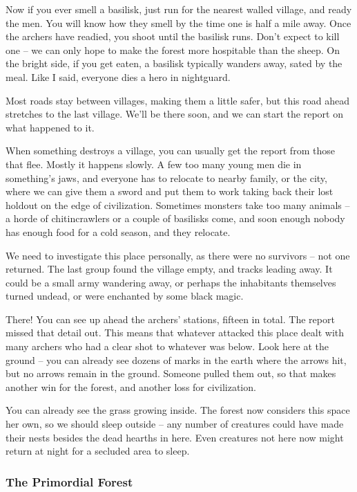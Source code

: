 \begin{multicols}{2}
\begin{exampletext}
	Now if you ever smell a basilisk, just run for the nearest walled village, and ready the men.
	You will know how they smell by the time one is half a mile away.
	Once the archers have readied, you shoot until the basilisk runs.
	Don't expect to kill one -- we can only hope to make the forest more hospitable than the sheep.
	On the bright side, if you get eaten, a basilisk typically wanders away, sated by the meal.
	Like I said, everyone dies a hero in \gls{nightguard}.

	Most roads stay between villages, making them a little safer, but this road ahead stretches to the last village.
	We'll be there soon, and we can start the report on what happened to it.

	When something destroys a village, you can usually get the report from those that flee.
	Mostly it happens slowly.
	A few too many young men die in something's jaws, and everyone has to relocate to nearby family, or the city, where we can give them a sword and put them to work taking back their lost holdout on the edge of civilization.
	Sometimes monsters take too many animals -- a horde of chitincrawlers or a couple of basilisks come, and soon enough nobody has enough food for a cold season, and they relocate.

	We need to investigate this place personally, as there were no survivors -- not one returned.
	The last group found the village empty, and tracks leading away.
	It could be a small army wandering away, or perhaps the inhabitants themselves turned undead, or were enchanted by some black magic.

	There! You can see up ahead the archers' stations, fifteen in total.
	The report missed that detail out.
	This means that whatever attacked this place dealt with many archers who had a clear shot to whatever was below.
	Look here at the ground -- you can already see dozens of marks in the earth where the arrows hit, but no arrows remain in the ground.
	Someone pulled them out, so that makes another win for the forest, and another loss for civilization.

	You can already see the grass growing inside.
	The forest now considers this space her own, so we should sleep outside -- any number of creatures could have made their nests besides the dead hearths in here.
	Even creatures not here now might return at night for a secluded area to sleep.

\end{exampletext}

\subsubsection{The Primordial Forest}


\end{multicols}
